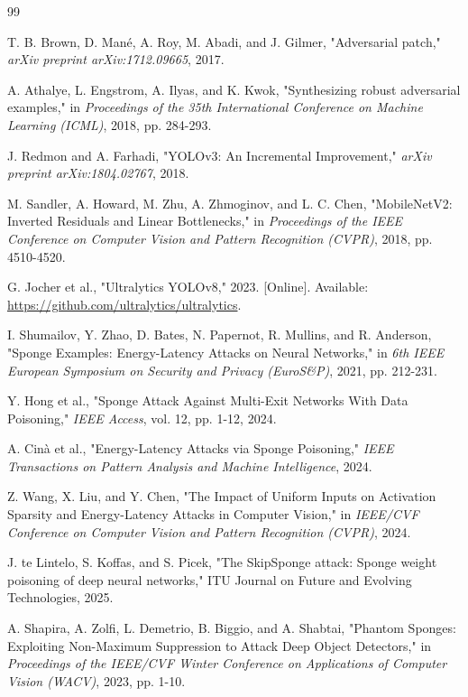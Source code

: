 \documentclass[a4paper,fleqn]{cas-dc}
\begin{document}
\begin{thebibliography}{99}

 T. B. Brown, D. Mané, A. Roy, M. Abadi, and J. Gilmer,
"Adversarial patch," \emph{arXiv preprint arXiv:1712.09665}, 2017.

 A. Athalye, L. Engstrom, A. Ilyas, and K. Kwok, "Synthesizing
robust adversarial examples," in \emph{Proceedings of the 35th
International Conference on Machine Learning (ICML)}, 2018, pp. 284-293.

 J. Redmon and A. Farhadi, "YOLOv3: An Incremental Improvement,"
\emph{arXiv preprint arXiv:1804.02767}, 2018.

 M. Sandler, A. Howard, M. Zhu, A. Zhmoginov, and L. C. Chen,
"MobileNetV2: Inverted Residuals and Linear Bottlenecks," in
\emph{Proceedings of the IEEE Conference on Computer Vision and Pattern
Recognition (CVPR)}, 2018, pp. 4510-4520.

 G. Jocher et al., "Ultralytics YOLOv8," 2023. {[}Online{]}.
Available: \url{https://github.com/ultralytics/ultralytics}.

 I. Shumailov, Y. Zhao, D. Bates, N. Papernot, R. Mullins, and R.
Anderson, "Sponge Examples: Energy-Latency Attacks on Neural Networks,"
in \emph{6th IEEE European Symposium on Security and Privacy
(EuroS\&P)}, 2021, pp. 212-231.

 Y. Hong et al., "Sponge Attack Against Multi-Exit Networks With
Data Poisoning," \emph{IEEE Access}, vol. 12, pp. 1-12, 2024.

 A. Cinà et al., "Energy-Latency Attacks via Sponge Poisoning,"
\emph{IEEE Transactions on Pattern Analysis and Machine Intelligence},
2024.

 Z. Wang, X. Liu, and Y. Chen, "The Impact of Uniform Inputs on
Activation Sparsity and Energy-Latency Attacks in Computer Vision," in
\emph{IEEE/CVF Conference on Computer Vision and Pattern Recognition
(CVPR)}, 2024.

 J. te Lintelo, S. Koffas, and S. Picek, "The SkipSponge attack:
Sponge weight poisoning of deep neural networks," ITU Journal on Future
and Evolving Technologies, 2025.

 A. Shapira, A. Zolfi, L. Demetrio, B. Biggio, and A. Shabtai,
"Phantom Sponges: Exploiting Non-Maximum Suppression to Attack Deep
Object Detectors," in \emph{Proceedings of the IEEE/CVF Winter
Conference on Applications of Computer Vision (WACV)}, 2023, pp. 1-10.


\end{thebibliography}
\end{document}
